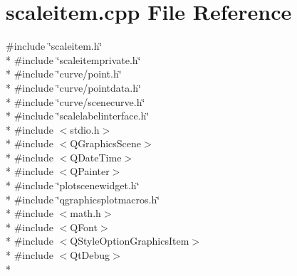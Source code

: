 \section{scaleitem.\+cpp File Reference}
\label{axes_2scaleitem_8cpp}
{\ttfamily \#include \char`\"{}scaleitem.\+h\char`\"{}}\\*
{\ttfamily \#include \char`\"{}scaleitemprivate.\+h\char`\"{}}\\*
{\ttfamily \#include \char`\"{}curve/point.\+h\char`\"{}}\\*
{\ttfamily \#include \char`\"{}curve/pointdata.\+h\char`\"{}}\\*
{\ttfamily \#include \char`\"{}curve/scenecurve.\+h\char`\"{}}\\*
{\ttfamily \#include \char`\"{}scalelabelinterface.\+h\char`\"{}}\\*
{\ttfamily \#include $<$stdio.\+h$>$}\\*
{\ttfamily \#include $<$Q\+Graphics\+Scene$>$}\\*
{\ttfamily \#include $<$Q\+Date\+Time$>$}\\*
{\ttfamily \#include $<$Q\+Painter$>$}\\*
{\ttfamily \#include \char`\"{}plotscenewidget.\+h\char`\"{}}\\*
{\ttfamily \#include \char`\"{}qgraphicsplotmacros.\+h\char`\"{}}\\*
{\ttfamily \#include $<$math.\+h$>$}\\*
{\ttfamily \#include $<$Q\+Font$>$}\\*
{\ttfamily \#include $<$Q\+Style\+Option\+Graphics\+Item$>$}\\*
{\ttfamily \#include $<$Qt\+Debug$>$}\\*
